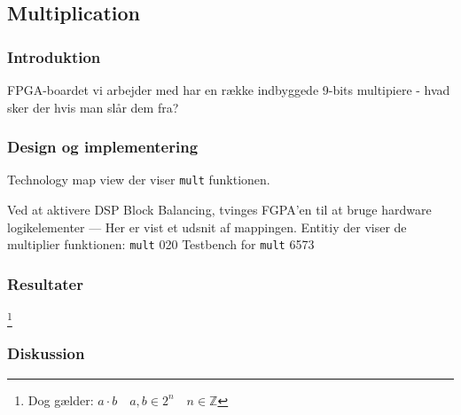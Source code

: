\subsection{Multiplication}

\subsubsection{Introduktion}


FPGA-boardet vi arbejder med har en række indbyggede 9-bits multipiere - hvad sker der hvis man slår dem fra? 

\subsubsection{Design og implementering}




{Technology map view der viser \texttt{mult} funktionen.}


{Ved at aktivere DSP Block Balancing, tvinges FGPA'en til at bruge hardware logikelementer --- Her er vist et udsnit af mappingen.}
{Entitiy der viser de multiplier funktionen: \texttt{mult}}
{0}{20}
{Testbench for \texttt{mult}}
{65}{73}

\subsubsection{Resultater}


\footnote{Dog gælder: $a\cdot b \quad a,b \in 2^n \quad n \in \mathbb{Z}$}
\subsubsection{Diskussion}


